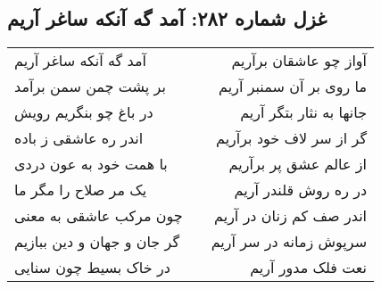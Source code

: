 \begin{center}
\section*{غزل شماره ۲۸۲: آمد گه آنکه ساغر آریم}
\label{sec:282}
\begin{longtable}{l p{0.5cm} r}
آمد گه آنکه ساغر آریم
&&
آواز چو عاشقان برآریم
\\
بر پشت چمن سمن برآمد
&&
ما روی بر آن سمنبر آریم
\\
در باغ چو بنگریم رویش
&&
جانها به نثار بتگر آریم
\\
اندر ره عاشقی ز باده
&&
گر از سر لاف خود برآریم
\\
با همت خود به عون دردی
&&
از عالم عشق پر برآریم
\\
یک مر صلاح را مگر ما
&&
در ره روش قلندر آریم
\\
چون مرکب عاشقی به معنی
&&
اندر صف کم زنان در آریم
\\
گر جان و جهان و دین ببازیم
&&
سرپوش زمانه در سر آریم
\\
در خاک بسیط چون سنایی
&&
نعت فلک مدور آریم
\\
\end{longtable}
\end{center}
